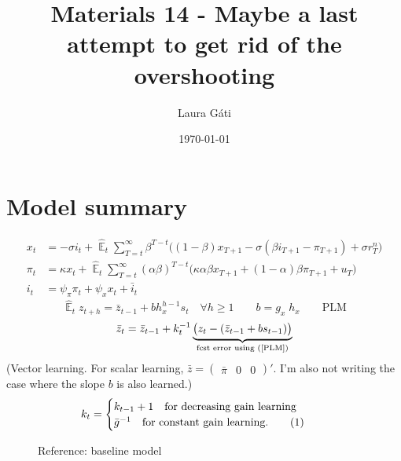 \documentclass[11pt]{article}
\def \myFigPath {../figures/}
\renewcommand{\[}{\begin{equation}}
\renewcommand{\]}{\end{equation}}
\DeclareMathOperator{\E}{\mathbb{E}}
\def\myAdjustableFigScale{0.14}
\newcommand\numberthis{\addtocounter{equation}{1}\tag{\theequation}} %
\begin{document}
\linespread{1.0}

\title{Materials 14 - Maybe a last attempt to get rid of the overshooting}
\author{Laura G\'ati} 
\date{\today}
\maketitle


\tableofcontents


\newpage
\section{Model summary}
\begin{align}
x_t &=  -\sigma i_t +\hat{\E}_t \sum_{T=t}^{\infty} \beta^{T-t }\big( (1-\beta)x_{T+1} - \sigma(\beta i_{T+1} - \pi_{T+1}) +\sigma r_T^n \big)  \label{prestons18}  \\
\pi_t &= \kappa x_t +\hat{\E}_t \sum_{T=t}^{\infty} (\alpha\beta)^{T-t }\big( \kappa \alpha \beta x_{T+1} + (1-\alpha)\beta \pi_{T+1} + u_T\big) \label{prestons19}  \\
i_t &= \psi_{\pi}\pi_t + \psi_{x} x_t  + \bar{i}_t \label{TR}
\end{align}
\begin{equation}
\hat{\E}_t z_{t+h} =  \bar{z}_{t-1} + bh_x^{h-1}s_t  \quad \forall h\geq 1 \quad \quad b = g_x\; h_x \quad \quad \text{PLM} \label{PLM}
\end{equation}
\begin{equation}
\bar{z}_{t} = \bar{z}_{t-1} +k_t^{-1}\underbrace{\big(z_{t} -(\bar{z}_{t-1}+bs_{t-1}) \big)}_{\text{fcst error using (\ref{PLM})} } 
\end{equation}
(Vector learning. For scalar learning, $\bar{z}= \begin{pmatrix} \bar{\pi} & 0 & 0\end{pmatrix}' $. I'm also not writing the case where the slope $b$ is also learned.)
 \begin{align*}
k_t & = \begin{cases} k_{t-1}+1 \quad \text{for decreasing gain learning}  \\ \bar{g}^{-1}  \quad \text{for constant gain learning.}\numberthis
\end{cases} 
\end{align*}

\newpage
\begin{figure}[h!]
\caption{Reference: baseline model}
\end{figure}
\end{document}
